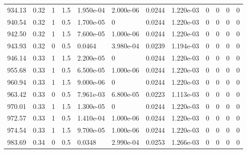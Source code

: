 \documentclass[preview]{standalone}
\begin{document}
{{{{{{\begin{tabular}{L{1.2cm}C{1.2cm} C{0.3cm}C{0.5cm} C{1.4cm}C{1.4cm} C{1.4cm}C{1.4cm} C{1.6cm}C{1.6cm} C{1.6cm}C{1.6cm}}
  934.13  &  0.32  & 1     & 1.5 &  1.950e-04  & 2.000e-06  &  0.0244&   1.220e-03& 0 & 0   &  0 & 0  \\ 
  940.54  &  0.32  & 1     & 0.5 &  1.700e-05  & 0  &  0.0244&   1.220e-03& 0 & 0   &  0 & 0  \\ 
  942.50  &  0.32  & 1     & 1.5 &  7.600e-05  & 1.000e-06  &  0.0244&   1.220e-03& 0 & 0   &  0 & 0  \\ 
  943.93  &  0.32  & 0     & 0.5 &  0.0464  & 3.980e-04  &  0.0239&   1.194e-03& 0 & 0   &  0 & 0  \\ 
  946.14  &  0.33  & 1     & 1.5 &  2.200e-05  & 0  &  0.0244&   1.220e-03& 0 & 0   &  0 & 0  \\ 
  955.68  &  0.33  & 1     & 0.5 &  6.500e-05  & 1.000e-06  &  0.0244&   1.220e-03& 0 & 0   &  0 & 0  \\ 
  960.94  &  0.33  & 1     & 1.5 &  9.000e-06  & 0  &  0.0244&   1.220e-03& 0 & 0   &  0 & 0  \\ 
  963.42  &  0.33  & 0     & 0.5 &  7.961e-03  & 6.800e-05  &  0.0223&   1.113e-03& 0 & 0   &  0 & 0  \\ 
  970.01  &  0.33  & 1     & 1.5 &  1.300e-05  & 0  &  0.0244&   1.220e-03& 0 & 0   &  0 & 0  \\ 
  972.57  &  0.33  & 1     & 0.5 &  1.410e-04  & 1.000e-06  &  0.0244&   1.220e-03& 0 & 0   &  0 & 0  \\ 
  974.54  &  0.33  & 1     & 1.5 &  9.700e-05  & 1.000e-06  &  0.0244&   1.220e-03& 0 & 0   &  0 & 0  \\ 
  983.69  &  0.34  & 0     & 0.5 &  0.0348  & 2.990e-04  &  0.0253&   1.266e-03& 0 & 0   &  0 & 0  \\ 
\hline 
\end{tabular} 

}}}}}}
\end{document}
